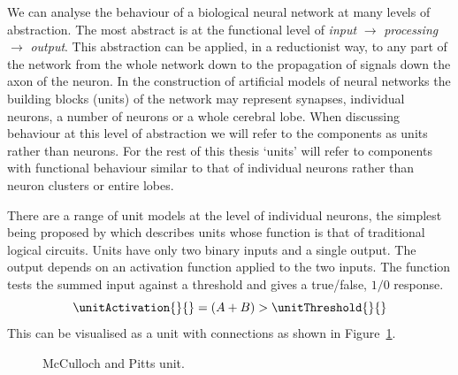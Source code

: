 We can analyse the behaviour of a biological neural network at many levels of abstraction.  The most abstract is at the functional level of \emph{input} \(\rightarrow\) \emph{processing} \(\rightarrow\) \emph{output}.  This abstraction can be applied, in a reductionist way, to any part of the network from the whole network down to the propagation of signals down the axon of the neuron.  In the construction of artificial models of neural networks the building blocks (units) of the network may represent synapses, individual neurons, a number of neurons or a whole cerebral lobe.  When discussing behaviour at this level of abstraction we will refer to the components as units rather than neurons.  For the rest of this thesis `units' will refer to components with functional behaviour similar to that of individual neurons rather than neuron clusters or entire lobes. 

There are a range of unit models at the level of individual neurons, the simplest being proposed by \citet{McCulloch1943} which describes units whose function is that of traditional logical circuits.  Units have only two binary inputs and a single output.  The output depends on an activation function applied to the two inputs.  The function tests the summed input against a threshold and gives a true/false, $1/0$ response. 
\begin{equation}
	\label{eq:Threshold}
	\unitActivation{}{} = (A + B) > \unitThreshold{}{}
\end{equation}
This can be visualised as a unit with connections as shown in Figure~\ref{fig:McCullochAndPittsUnit}.

\begin{figure}[ht]
	\begin{center}
		
	\end{center}
	\caption{McCulloch and Pitts unit.}
	\label{fig:McCullochAndPittsUnit}
\end{figure}

